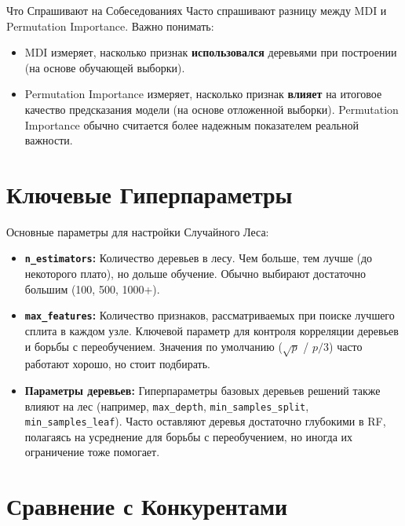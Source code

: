 \begin{alerttextbox}{Что Спрашивают на Собеседованиях}
    Часто спрашивают разницу между MDI и Permutation Importance. Важно понимать:
    \begin{itemize}
        \item MDI измеряет, насколько признак \textbf{использовался} деревьями при построении (на основе обучающей выборки).
        \item Permutation Importance измеряет, насколько признак \textbf{влияет} на итоговое качество предсказания модели (на основе отложенной выборки). Permutation Importance обычно считается более надежным показателем реальной важности.
    \end{itemize}
\end{alerttextbox}

\section{Ключевые Гиперпараметры}
Основные параметры для настройки Случайного Леса:
\begin{itemize}
    \item \textbf{\texttt{n\_estimators}:} Количество деревьев в лесу. Чем больше, тем лучше (до некоторого плато), но дольше обучение. Обычно выбирают достаточно большим (100, 500, 1000+).
    \item \textbf{\texttt{max\_features}:} Количество признаков, рассматриваемых при поиске лучшего сплита в каждом узле. Ключевой параметр для контроля корреляции деревьев и борьбы с переобучением. Значения по умолчанию (\(\sqrt{p}\) / \(p/3\)) часто работают хорошо, но стоит подбирать.
    \item \textbf{Параметры деревьев:} Гиперпараметры базовых деревьев решений также влияют на лес (например, \texttt{max\_depth}, \texttt{min\_samples\_split}, \texttt{min\_samples\_leaf}). Часто оставляют деревья достаточно глубокими в RF, полагаясь на усреднение для борьбы с переобучением, но иногда их ограничение тоже помогает.
\end{itemize}

\section{Сравнение с Конкурентами}

